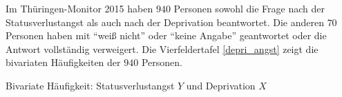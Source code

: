 \documentclass[11pt]{article}
\begin{document}
\begin{enumerate}
\begin{itemize}
{\begin{description}
    \end{description}
      }
 \end{itemize}

Im Thüringen-Monitor 2015 haben $940$ Personen sowohl die Frage nach der 
Statusverlustangst als auch nach der Deprivation beantwortet. Die anderen $70$ Personen haben mit ``weiß nicht'' oder ``keine Angabe''
geantwortet oder die Antwort vollständig verweigert. Die  Vierfeldertafel \ref{depri_angst} zeigt die bivariaten Häufigkeiten
der $940$ Personen.


  \begin{table}[ht]
\centering
\caption{Bivariate Häufigkeit: Statusverlustangst $Y$ und Deprivation $X$}




\end{table}
\end{enumerate}
\end{document}
